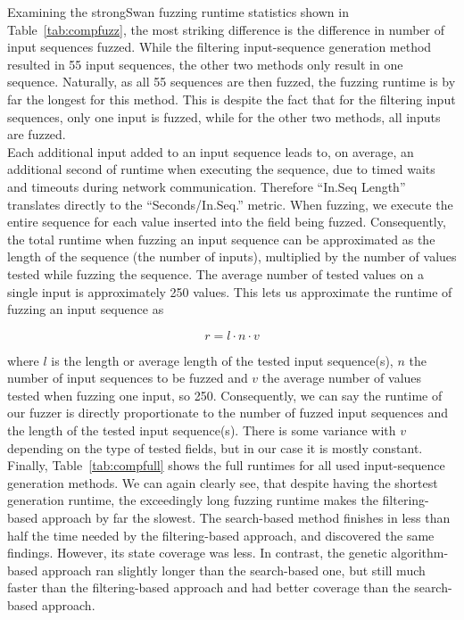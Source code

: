 Examining the strongSwan fuzzing runtime statistics shown in Table~\ref{tab:compfuzz}, the most striking difference is the difference in number of input sequences fuzzed. While the filtering input-sequence generation method resulted in 55 input sequences, the other two methods only result in one sequence. Naturally, as all 55 sequences are then fuzzed, the fuzzing runtime is by far the longest for this method. This is despite the fact that for the filtering input sequences, only one input is fuzzed, while for the other two methods, all inputs are fuzzed. \\

Each additional input added to an input sequence leads to, on average, an additional second of runtime when executing the sequence, due to timed waits and timeouts during network communication. Therefore ``In.Seq Length'' translates directly to the  ``Seconds/In.Seq.'' metric. When fuzzing, we execute the entire sequence for each value inserted into the field being fuzzed. Consequently, the total runtime when fuzzing an input sequence can be approximated as the length of the sequence (the number of inputs), multiplied by the number of values tested while fuzzing the sequence. The average number of tested values on a single input is approximately 250 values. This lets us approximate the runtime of fuzzing an input sequence as

\begin{equation}
	r = l \cdot n \cdot v
\end{equation}
\vspace{3mm}

where $l$ is the length or average length of the tested input sequence(s), $n$ the number of input sequences to be fuzzed and $v$ the average number of values tested when fuzzing one input, so 250. Consequently, we can say the runtime of our fuzzer is directly proportionate to the number of fuzzed input sequences and the length of the tested input sequence(s). There is some variance with $v$ depending on the type of tested fields, but in our case it is mostly constant. 
\newpage
Finally, Table~\ref{tab:compfull} shows the full runtimes for all used input-sequence generation methods. We can again clearly see, that despite having the shortest generation runtime, the exceedingly long fuzzing runtime makes the filtering-based approach by far the slowest. The search-based method finishes in less than half the time needed by the filtering-based approach, and discovered the same findings. However, its state coverage was less. In contrast, the genetic algorithm-based approach ran slightly longer than the search-based one, but still much faster than the filtering-based approach and had better coverage than the search-based approach.

